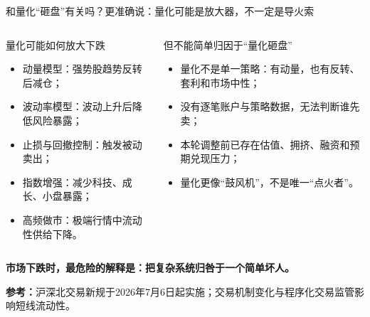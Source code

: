 \documentclass[UTF8,aspectratio=169,11pt]{ctexbeamer}
\newcommand{\source}[1]{\vfill{\scriptsize\color{aqgray}\textbf{参考：}#1}}
\begin{document}
\begin{frame}{和量化“砸盘”有关吗？更准确说：量化可能是放大器，不一定是导火索}
\small
\begin{columns}[T,totalwidth=\textwidth]
\begin{keybox}{量化可能如何放大下跌}
\begin{itemize}
\item 动量模型：强势股趋势反转后减仓；
\item 波动率模型：波动上升后降低风险暴露；
\item 止损与回撤控制：触发被动卖出；
\item 指数增强：减少科技、成长、小盘暴露；
\item 高频做市：极端行情中流动性供给下降。
\end{itemize}
\end{keybox}

\begin{riskbox}{但不能简单归因于“量化砸盘”}
\begin{itemize}
\item 量化不是单一策略：有动量，也有反转、套利和市场中性；
\item 没有逐笔账户与策略数据，无法判断谁先卖；
\item 本轮调整前已存在估值、拥挤、融资和预期兑现压力；
\item 量化更像“鼓风机”，不是唯一“点火者”。
\end{itemize}
\end{riskbox}
\end{columns}

\vspace{0.2cm}
\begin{center}
\Large \textbf{市场下跌时，最危险的解释是：把复杂系统归咎于一个简单坏人。}
\end{center}

\source{沪深北交易新规于2026年7月6日起实施；交易机制变化与程序化交易监管影响短线流动性。}
\end{frame}
\end{document}
